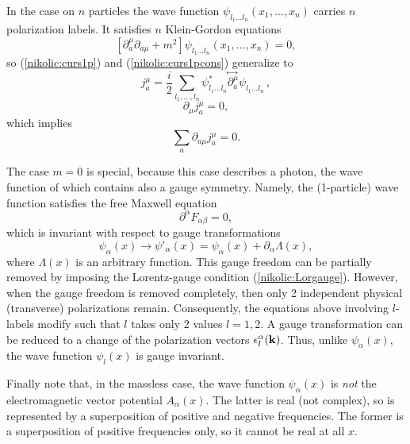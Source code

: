 \documentclass[12pt,twoside]{report} %
\begin{document}
In the case on $n$ particles the wave function 
$\psi_{l_1\ldots l_n}(x_1,\ldots,x_n)$ carries $n$ polarization labels.
It satisfies $n$ Klein-Gordon equations
\begin{equation}\label{nikolic:KGs1}
 [\partial_a^{\mu}\partial_{a\mu}+m^2]\psi_{l_1\ldots l_n}(x_1,\ldots,x_n) =0 ,
\end{equation} 
so (\ref{nikolic:curs1p}) and (\ref{nikolic:curs1pcons}) generalize to
\begin{equation}\label{nikolic:curs1}
j_a^{\mu}=\frac{i}{2} \sum_{l_1,\ldots , l_n} \psi^*_{l_1\ldots l_n} 
\!\stackrel{\leftrightarrow\;}{\partial_a^{\mu}}\! \psi_{l_1\ldots l_n}\, ,
\end{equation}
\begin{equation}
 \partial_{\mu}j_a^{\mu}=0 ,
\end{equation}
which implies
\begin{equation}
\sum_a \partial_{a\mu}j_a^{\mu}=0 .
\end{equation}

The case $m=0$ is special, because this case describes a photon, the wave function
of which contains also a gauge symmetry.
Namely, the (1-particle) wave function satisfies the free Maxwell equation
\begin{equation}\label{nikolic:maxwell}
 \partial^{\alpha}F_{\alpha\beta}=0 ,
\end{equation}
which is invariant with respect to gauge transformations
\begin{equation}
 \psi_{\alpha}(x) \rightarrow \psi'_{\alpha}(x) =\psi_{\alpha}(x) +\partial_{\alpha}\Lambda(x) ,
\end{equation}
where $\Lambda(x)$ is an arbitrary function. 
This gauge freedom can be partially removed by
imposing the Lorentz-gauge condition (\ref{nikolic:Lorgauge}). However, when the gauge
freedom is removed completely, then only 2 independent physical (transverse) 
polarizations remain. Consequently, the equations above involving $l$-labels 
modify such that $l$ takes only 2 values $l=1,2$. A gauge transformation
can be reduced to a change of the polarization vectors $\epsilon^{\alpha}_l({\bf k})$.
Thus, unlike $\psi_{\alpha}(x)$,
the wave function $\psi_l(x)$ is gauge invariant. 

Finally note that, in the massless case, the wave function $\psi_{\alpha}(x)$ 
is {\em not} the electromagnetic vector potential $A_{\alpha}(x)$. The latter is real
(not complex), so is represented by a superposition of positive and negative frequencies.
The former is a superposition of positive frequencies only, so it cannot be real at all $x$.
\end{document}
